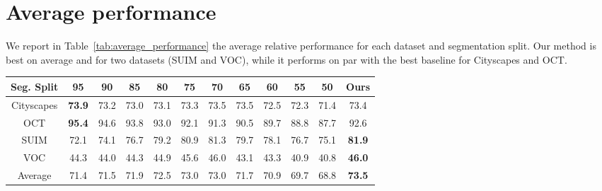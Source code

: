 \section{Average performance}
\label{sec:average}

We report in Table~\ref{tab:average_performance} the average relative performance for each dataset and segmentation split. Our method is best on average and for two datasets (SUIM and VOC), while it performs on par with the best baseline for Cityscapes and OCT.

\begin{table*}[htbp]
\centering
\caption{Relative performance (in \%) against full supervision for each dataset and segmentation split.}
\label{tab:average_performance}
\begin{tabular}{@{}cccccccccccc@{}}
\toprule
Seg. Split & 95 & 90 & 85 & 80 & 75 & 70 & 65 & 60 & 55 & 50 & Ours \\ \midrule
Cityscapes & \textbf{73.9} & 73.2 & 73.0 & 73.1 & 73.3 & 73.5 & 73.5 & 72.5 & 72.3 & 71.4 & 73.4 \\
OCT & \textbf{95.4} & 94.6 & 93.8 & 93.0 & 92.1 & 91.3 & 90.5 & 89.7 & 88.8 & 87.7 & 92.6 \\
SUIM & 72.1 & 74.1 & 76.7 & 79.2 & 80.9 & 81.3 & 79.7 & 78.1 & 76.7 & 75.1 & \textbf{81.9} \\
VOC & 44.3 & 44.0 & 44.3 & 44.9 & 45.6 & 46.0 & 43.1 & 43.3 & 40.9 & 40.8 & \textbf{46.0} \\ \hline
Average & 71.4 & 71.5 & 71.9 & 72.5 & 73.0 & 73.0 & 71.7 & 70.9 & 69.7 & 68.8 & \textbf{73.5} \\ \bottomrule
\end{tabular}

\end{table*}